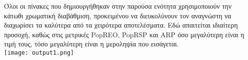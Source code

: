 \begin{tcolorbox}[
	colframe=blue!25,
	colback=blue!10,
	coltitle=blue!20!black,  
	fonttitle=\bfseries,
	adjusted title= Σημείωση]
	Όλοι οι πίνακες που δημιουργήθηκαν στην παρούσα ενότητα χρησιμοποιούν την κάτωθι χρωματική διαβάθμιση, προκειμένου να διευκολύνουν τον αναγνώστη να διαχωρίσει τα καλύτερα από τα χειρότερα αποτελέσματα. Εδώ απαιτείται ιδιαίτερη προσοχή, καθώς στις μετρικές PopREO, PopRSP και ARP όσο μεγαλύτερη είναι η τιμή τους, τόσο μεγαλύτερη είναι η μεροληψία που εισάγεται.\\
	
		\centering
		\texttt{[image: output1.png]}
		\label{fig:scale}
	
\end{tcolorbox}
\newpage
